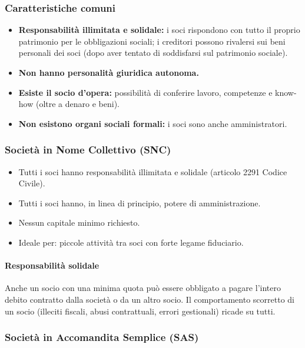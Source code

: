 \documentclass[a4paper,12pt]{article}
\begin{document}
	\subsubsection{Caratteristiche comuni}
	
	\begin{itemize}
		\item \textbf{Responsabilità illimitata e solidale:} i soci rispondono con tutto il proprio patrimonio per le obbligazioni sociali; i creditori possono rivalersi sui beni personali dei soci (dopo aver tentato di soddisfarsi sul patrimonio sociale).
		\item \textbf{Non hanno personalità giuridica autonoma.}
		\item \textbf{Esiste il socio d'opera:} possibilità di conferire lavoro, competenze e know-how (oltre a denaro e beni).
		\item \textbf{Non esistono organi sociali formali:} i soci sono anche amministratori.
	\end{itemize}
	
	\subsubsection{Società in Nome Collettivo (SNC)}
	
	\begin{itemize}
		\item Tutti i soci hanno responsabilità illimitata e solidale (articolo 2291 Codice Civile).
		\item Tutti i soci hanno, in linea di principio, potere di amministrazione.
		\item Nessun capitale minimo richiesto.
		\item Ideale per: piccole attività tra soci con forte legame fiduciario.
	\end{itemize}
	
	\paragraph{Responsabilità solidale}
	
	Anche un socio con una minima quota può essere obbligato a pagare l'intero debito contratto dalla società o da un altro socio.%
	Il comportamento scorretto di un socio (illeciti fiscali, abusi contrattuali, errori gestionali) ricade su tutti.
	
	\subsubsection{Società in Accomandita Semplice (SAS)}
	
\end{document}

